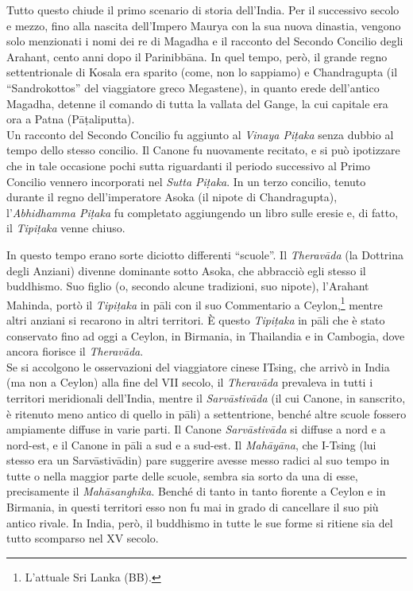  Tutto questo chiude il primo scenario di storia
dell’India. Per il successivo secolo e mezzo, fino alla nascita
dell’Impero Maurya con la sua nuova dinastia, vengono solo menzionati i
nomi dei re di Magadha e il racconto del Secondo Concilio degli Arahant,
cento anni dopo il Parinibbāna. In quel tempo, però, il grande regno
settentrionale di Kosala era sparito (come, non lo sappiamo) e
Chandragupta (il “Sandrokottos” del viaggiatore greco Megastene), in
quanto erede dell’antico Magadha, detenne il comando di tutta la vallata
del Gange, la cui capitale era ora a Patna (Pāṭaliputta). \\
Un racconto del Secondo Concilio fu aggiunto al \emph{Vinaya Piṭaka} senza
dubbio al tempo dello stesso concilio. Il Canone fu nuovamente recitato,
e si può ipotizzare che in tale occasione pochi sutta riguardanti il
periodo successivo al Primo Concilio vennero incorporati nel \emph{Sutta
Piṭaka}. In un terzo concilio, tenuto durante il regno dell’imperatore
Asoka (il nipote di Chandragupta), l’\emph{Abhidhamma Piṭaka} fu completato
aggiungendo un libro sulle eresie e, di fatto, il \emph{Tipiṭaka} venne
chiuso.


In questo tempo erano sorte diciotto differenti “scuole”. Il
\emph{Theravāda} (la Dottrina degli Anziani) divenne dominante sotto Asoka,
che abbracciò egli stesso il buddhismo. Suo figlio (o, secondo alcune
tradizioni, suo nipote), l’Arahant Mahinda, portò il \emph{Tipiṭaka} in pāli
con il suo Commentario a Ceylon,\footnote{L’attuale Sri Lanka (BB).}
mentre altri anziani
si recarono in altri territori. È questo \emph{Tipiṭaka} in pāli che è stato
conservato fino ad oggi a Ceylon, in Birmania, in Thailandia e in
Cambogia, dove ancora fiorisce il \emph{Theravāda}. \\
Se si accolgono le osservazioni del viaggiatore cinese ITsing, che
arrivò in India (ma non a Ceylon) alla fine del VII secolo, il
\emph{Theravāda} prevaleva in tutti i territori meridionali dell’India,
mentre il \emph{Sarvāstivāda} (il cui Canone, in sanscrito, è ritenuto meno
antico di quello in pāli) a settentrione, benché altre scuole fossero
ampiamente diffuse in varie parti. Il Canone \emph{Sarvāstivāda} si diffuse a
nord e a nord-est, e il Canone in pāli a sud e a sud-est. Il \emph{Mahāyāna},
che I-Tsing (lui stesso era un Sarvāstivādin) pare suggerire avesse
messo radici al suo tempo in tutte o nella maggior parte delle scuole,
sembra sia sorto da una di esse, precisamente il \emph{Mahāsanghika}. Benché
di tanto in tanto fiorente a Ceylon e in Birmania, in questi territori
esso non fu mai in grado di cancellare il suo più antico rivale. In
India, però, il buddhismo in tutte le sue forme si ritiene sia del tutto
scomparso nel XV secolo.


